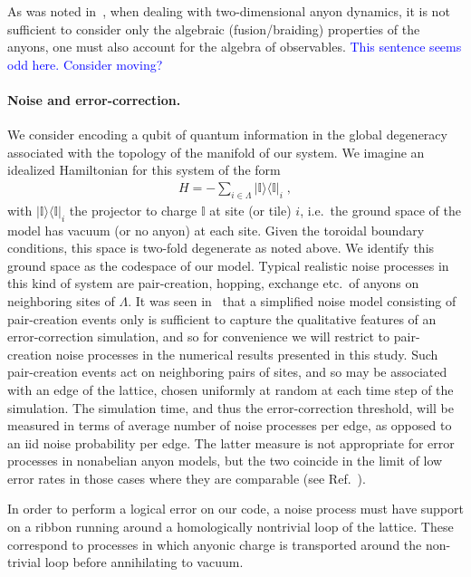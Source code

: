 \documentclass[aps, prl, letterpaper, twocolumn, superscriptaddress, notitlepage, 10pt]{revtex4-1}
\newcommand{\ket}[1]{|{#1}\rangle}
\newcommand{\bra}[1]{\langle{#1}|}
\newcommand{\ketbra}[2]{\ket{#1}\!\bra{#2}}
\newcommand{\proj}[1]{\ketbra{#1}{#1}}
\newcommand{\cggb}[1]{\textcolor{blue}{#1}}
\begin{document}
As was noted in~\cite{Pfeifer2014}, when dealing with two-dimensional 
anyon dynamics, it is not sufficient to consider only
the algebraic (fusion/braiding) properties of the anyons,
one must also account for the algebra of observables. \cggb{This sentence seems odd here. Consider moving?}

\paragraph{Noise and error-correction.}

We consider encoding a qubit of quantum information in the global degeneracy associated 
with the topology of the manifold of our system. We imagine an idealized Hamiltonian for this 
system of the form
\begin{align}
	H=-\sum_{i\in \Lambda}\proj{\mathbb{I}}_i\;,\label{e:hamiltonian}
\end{align}
with $\proj{\mathbb{I}}_i$ the projector to charge $\mathbb{I}$ at site (or tile) $i$, i.e.~the ground 
space of the model has vacuum (or no anyon) at each site. Given the toroidal boundary 
conditions, this space is two-fold degenerate as noted above. We identify this ground space 
as the codespace of our model. Typical realistic noise processes in this kind of system are 
pair-creation, hopping, exchange etc.~of anyons on neighboring sites of $\Lambda$. It was 
seen in~\cite{Brell2013} that a simplified noise model consisting of pair-creation events only 
is sufficient to capture the qualitative features of an error-correction simulation, and so for convenience we 
will restrict to pair-creation noise processes in the numerical results presented in this study. 
Such pair-creation events act on neighboring pairs of sites,
and so may be associated with an edge of the lattice, chosen 
uniformly at random at each time step of the simulation. The simulation time, and thus the 
error-correction threshold, will be measured in terms of average number of noise processes 
per edge, as opposed to an iid noise probability per edge. The latter measure is not 
appropriate for error processes in nonabelian anyon models, but the two coincide in the limit 
of low error rates in those cases where they are comparable (see Ref.~\cite{Brell2013}).

In order to perform a logical error on our code, a noise process must have support on a 
ribbon running around a homologically nontrivial loop of the lattice. These correspond to 
processes in which anyonic charge is transported around the non-trivial loop before 
annihilating to vacuum.
\end{document}
